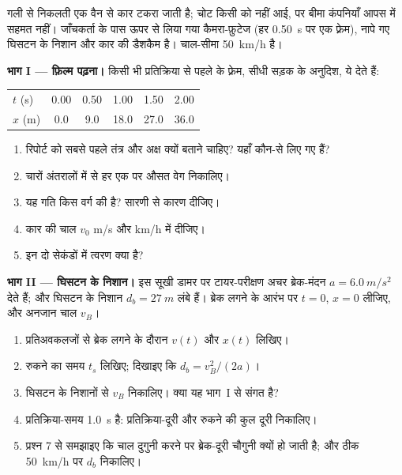 \begin{problem}
\label{pb:g12:kinematics-2d:1}
गली से निकलती एक वैन से कार टकरा जाती है; चोट किसी को नहीं आई, पर बीमा कंपनियाँ
आपस में सहमत नहीं। जाँचकर्ता के पास ऊपर से लिया गया कैमरा-फ़ुटेज (हर \qty{0.50}{s}
पर एक फ़्रेम), नापे गए घिसटन के निशान और कार की डैशकैम है। चाल-सीमा
\qty{50}{km/h} है।

\medskip
\noindent\textbf{भाग I --- फ़िल्म पढ़ना।}
किसी भी प्रतिक्रिया से पहले के फ़्रेम, सीधी सड़क के अनुदिश, ये देते हैं:
\begin{center}\small
\begin{tabular}{lccccc}
$t$ (\unit{s}) & 0.00 & 0.50 & 1.00 & 1.50 & 2.00\\
$x$ (\unit{m}) & 0.0 & 9.0 & 18.0 & 27.0 & 36.0
\end{tabular}
\end{center}
\begin{enumerate}
  \item रिपोर्ट को सबसे पहले तंत्र और अक्ष क्यों बताने चाहिए? यहाँ कौन-से
        लिए गए हैं?
  \item चारों अंतरालों में से हर एक पर औसत वेग निकालिए।
  \item यह गति किस वर्ग की है? सारणी से कारण दीजिए।
  \item कार की चाल $v_0$ \unit{m/s} और \unit{km/h} में दीजिए।
  \item इन दो सेकंडों में त्वरण क्या है?
\end{enumerate}

\medskip
\noindent\textbf{भाग II --- घिसटन के निशान।}
इस सूखी डामर पर टायर-परीक्षण अचर ब्रेक-मंदन $a = \qty{6.0}{m/s^2}$ देते हैं; और घिसटन के
निशान $d_b = \qty{27}{m}$ लंबे हैं। ब्रेक लगने के आरंभ पर $t = 0$, $x = 0$ लीजिए, और
अनजान चाल $v_B$।
\begin{enumerate}[resume]
  \item प्रतिअवकलजों से ब्रेक लगने के दौरान $v(t)$ और $x(t)$ लिखिए।
  \item रुकने का समय $t_s$ लिखिए; दिखाइए कि $d_b = v_B^2/(2a)$।
  \item घिसटन के निशानों से $v_B$ निकालिए। क्या यह भाग~I से संगत है?
  \item प्रतिक्रिया-समय \qty{1.0}{s} है: प्रतिक्रिया-दूरी और रुकने की कुल दूरी
        निकालिए।
  \item प्रश्न 7 से समझाइए कि चाल दुगुनी करने पर ब्रेक-दूरी चौगुनी
        क्यों हो जाती है; और ठीक \qty{50}{km/h} पर $d_b$ निकालिए।
\end{enumerate}


\end{problem}
